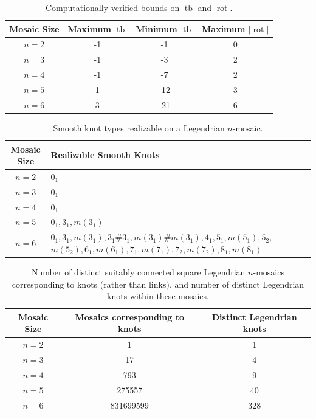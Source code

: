 \documentclass{article}
\DeclareMathOperator{\tb}{tb}
\DeclareMathOperator{\rot}{rot}
\begin{document}
\begin{table}
    \centering
    \begin{tabular}{|c|c|c|c|}
    \hline
    Mosaic Size & Maximum $\tb$ & Minimum $\tb$ & Maximum $|\rot|$ \\
    \hline
    $n=2$ & -1 & -1 & 0 \\
    $n=3$ & -1 & -3 & 2 \\
    $n=4$ & -1 & -7 & 2 \\
    $n=5$ & 1 & -12 & 3 \\
    $n=6$ & 3 & -21 & 6 \\
    \hline
    \end{tabular}
    \caption{Computationally verified bounds on $\tb$ and $\rot$.}
    \label{tab:bounds_by_size}
\end{table}

\begin{table}
    \centering
    \begin{tabular}{|c|p{8cm}|}
    \hline
    Mosaic Size & Realizable Smooth Knots \\
    \hline
    $n=2$ & $0_1$ \\
    $n=3$ & $0_1$ \\
    $n=4$ & $0_1$ \\
    $n=5$ & $0_1, 3_1, m(3_1)$ \\
    $n=6$ & $0_1, 3_1, m(3_1), 3_1\#3_1, m(3_1)\#m(3_1), 4_1, 5_1, m(5_1), 5_2,$ $m(5_2), 6_1, m(6_1), 7_1, m(7_1), 7_2, m(7_2), 8_1, m(8_1)$ \\
    \hline
    \end{tabular}
    \caption{Smooth knot types realizable on a Legendrian $n$-mosaic.}
    \label{tab:knots_by_size}
\end{table}

\begin{table}
    \centering
    \begin{tabular}{|c|c|c|}
    \hline
    Mosaic Size & Mosaics corresponding to knots & Distinct Legendrian knots\\
    \hline
    $n=2$ & 1 & 1 \\
    $n=3$ & 17 & 4 \\
    $n=4$ & 793 & 9 \\
    $n=5$ & 275557 & 40 \\
    $n=6$ & 831699599 & 328 \\
    \hline
    \end{tabular}
    \caption{Number of distinct suitably connected square Legendrian $n$-mosaics corresponding to knots (rather than links), and number of distinct Legendrian knots within these mosaics.}
    \label{tab:mosaics_by_size}
\end{table}
\end{document}
